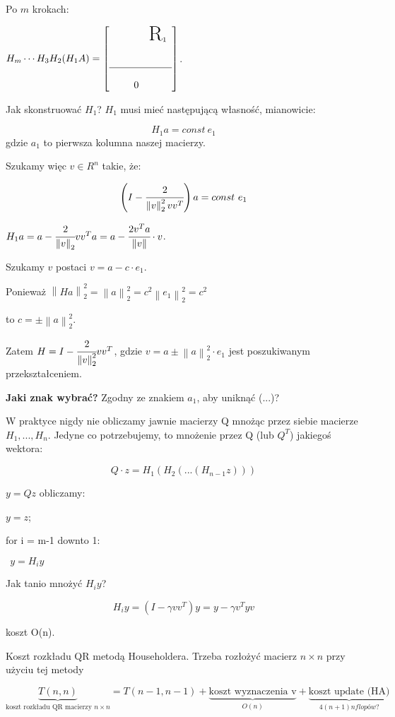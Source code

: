\documentclass[hidelinks,a4paper]{article}
\newcommand{\norm}[1]{\left\lVert#1\right\rVert}
\begin{document}
Po $m$ krokach:

$H_m \cdots H_3 H_2 (H_1 A) = \left[ \begin{array}{ccc} & & \text{\huge R}_1 \\ \\ \\ \hline \\ & \quad 0 & \end{array}\right]$.

Jak skonstruować $H_1$? $H_1$ musi mieć następującą własność, mianowicie:

\[
	H_1 a = const\ e_1
\]
gdzie $a_1$ to pierwsza kolumna naszej macierzy.

Szukamy więc $v \in R^n$ takie, że:

\[
	\left(I - \cfrac{2}{\norm{v}_2^2 vv^T}\right)a = const\ e_1
\]

$H_1a = a - \cfrac{2}{\norm{v}_2} v v^Ta = a - \cfrac{2v^Ta}{\norm{v}} \cdot v$.

Szukamy $v$ postaci $v = a - c\cdot e_1$.

Ponieważ $\norm{Ha}_2^2 = \norm{a}^2_2 = c^2 \norm{e_1}^2_2 = c^2$

to $c = \pm \norm{a} ^2_2$.


Zatem $H = I - \cfrac{2}{\norm{v}_2^2} vv^T$, gdzie $v = a \pm \norm{a}_2^2 \cdot e_1$ jest poszukiwanym przekształceniem.

\textbf{Jaki znak wybrać?} Zgodny ze znakiem $a_1$, aby uniknąć (...)?

W praktyce nigdy nie obliczamy jawnie macierzy Q mnożąc przez siebie macierze $H_1, ..., H_n$. Jedyne co potrzebujemy, to mnożenie przez Q (lub $Q^T$) jakiegoś wektora:

\[
	Q \cdot z = H_1(H_2(...(H_{n-1}z)))
\]

$y = Qz$ obliczamy:

$y=z$;

for i = m-1 downto 1:

$\ \ y = H_iy$

Jak tanio mnożyć $H_i y$?

\[
	H_i y = (I - \gamma vv^T)y = y - \gamma v^Tyv
\]

koszt O(n).

Koszt rozkładu QR metodą Householdera. Trzeba rozłożyć macierz $n \times n$ przy użyciu tej metody

\[
	\underbrace{T(n, n)}_{\textrm{koszt rozkładu QR macierzy }n \times n} = T(n-1, n-1) + \underbrace{\textrm{koszt wyznaczenia v}}_{O(n)} + \underbrace{\textrm{koszt update (HA)}}_{4(n+1)n flopów?}
\]
\end{document}
